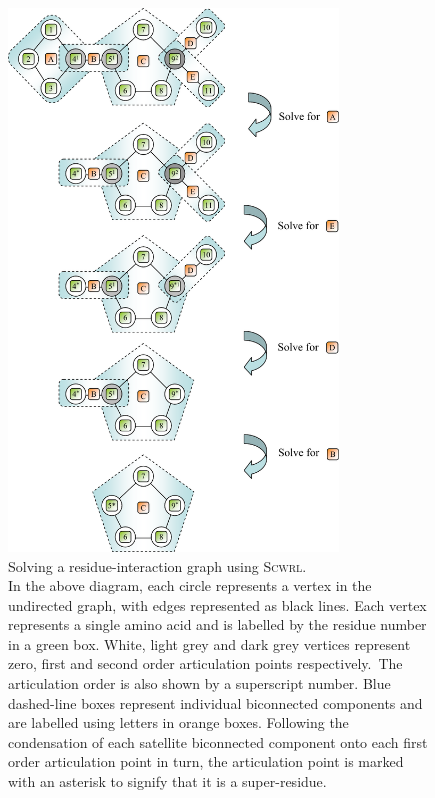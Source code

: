 \begin{figure}[hbtp]
\begin{center}
\includegraphics[width=0.78\textwidth]{./09-Arcus/scwrl/graph.pdf}
\caption[Solving a residue-interaction graph using \textsc{Scwrl}]{Solving a residue-interaction graph using \textsc{Scwrl}. \\
In the above diagram, each circle represents a vertex in the undirected graph, with edges represented as black lines. Each vertex represents a single amino acid and is labelled by the residue number in a green box. White, light grey and dark grey vertices represent zero, first and second order articulation points respectively.\ The articulation order is also shown by a superscript number. Blue dashed-line boxes represent individual biconnected components and are labelled using letters in orange boxes. Following the condensation of each satellite biconnected component onto each first order articulation point in turn, the articulation point is marked with an asterisk to signify that it is a super-residue.}
\label{figure:arcus:graph_theory}
\end{center}
\end{figure}

